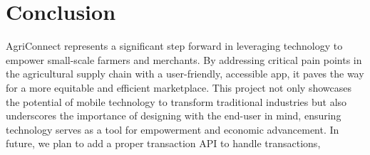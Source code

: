 \documentclass{article}
\begin{document}
\section{Conclusion}
AgriConnect represents a significant step forward in leveraging technology to empower small-scale farmers and merchants. By addressing critical pain points in the agricultural supply chain with a user-friendly, accessible app, it paves the way for a more equitable and efficient marketplace. This project not only showcases the potential of mobile technology to transform traditional industries but also underscores the importance of designing with the end-user in mind, ensuring technology serves as a tool for empowerment and economic advancement. In future, we plan to add a proper transaction API to handle transactions, 

 

\end{document}
